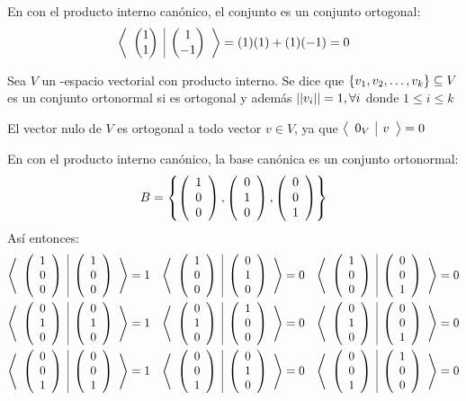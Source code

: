 \begin{ejemplo}
    En \rdos con el producto interno canónico, el conjunto  es un conjunto ortogonal:
    \begin{align*}
        \prodInt{\vectrdos{1}{1}}{\vectrdos{1}{-1}} = (1)(1) + (1)(-1) = 0
    \end{align*}
\end{ejemplo}

\begin{dfn}
Sea $V$ un \dobleK-espacio vectorial con producto interno. Se dice que $\conjvect{v}{k} \subseteq V$ es un conjunto ortonormal si es ortogonal y además $\norm{v_i} = 1, \forall i$ donde $1 \leq i \leq k$ 
\end{dfn}

\begin{obs}
    El vector nulo de $V$ es ortogonal a todo vector $v \in V$, ya que $\prodInt{0_V}{v} = 0$
\end{obs}

\begin{ejemplo}
    En \rtres con el producto interno canónico, la base canónica es un conjunto ortonormal:
    $$B = \llav{\vectrtres{1}{0}{0}, \vectrtres{0}{1}{0}, \vectrtres{0}{0}{1}}$$
    Así entonces:
    \begin{align*}
        \prodInt{\vectrtres{1}{0}{0}}{\vectrtres{1}{0}{0}} = 1 &&
        \prodInt{\vectrtres{1}{0}{0}}{\vectrtres{0}{1}{0}} = 0 && \prodInt{\vectrtres{1}{0}{0}}{\vectrtres{0}{0}{1}} = 0\\
        \prodInt{\vectrtres{0}{1}{0}}{\vectrtres{0}{1}{0}} = 1 &&
        \prodInt{\vectrtres{0}{1}{0}}{\vectrtres{1}{0}{0}} = 0 &&
        \prodInt{\vectrtres{0}{1}{0}}{\vectrtres{0}{0}{1}} = 0\\
        \prodInt{\vectrtres{0}{0}{1}}{\vectrtres{0}{0}{1}} = 1 &&
        \prodInt{\vectrtres{0}{0}{1}}{\vectrtres{0}{1}{0}} = 0 &&
        \prodInt{\vectrtres{0}{0}{1}}{\vectrtres{1}{0}{0}} = 0
    \end{align*}
\end{ejemplo}


